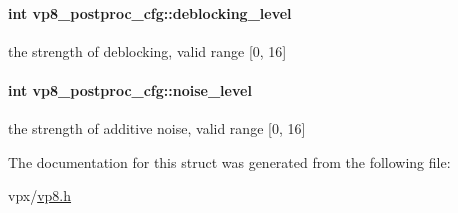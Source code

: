 \paragraph[{\texorpdfstring{deblocking\+\_\+level}{deblocking_level}}]{\setlength{\rightskip}{0pt plus 5cm}int vp8\+\_\+postproc\+\_\+cfg\+::deblocking\+\_\+level}\hypertarget{structvp8__postproc__cfg_afe919a9546e79798d840b1492f7e0249}{}\label{structvp8__postproc__cfg_afe919a9546e79798d840b1492f7e0249}
the strength of deblocking, valid range \mbox{[}0, 16\mbox{]} 
\paragraph[{\texorpdfstring{noise\+\_\+level}{noise_level}}]{\setlength{\rightskip}{0pt plus 5cm}int vp8\+\_\+postproc\+\_\+cfg\+::noise\+\_\+level}\hypertarget{structvp8__postproc__cfg_a32f28e4003e5d9bf55d188247f3f156c}{}\label{structvp8__postproc__cfg_a32f28e4003e5d9bf55d188247f3f156c}
the strength of additive noise, valid range \mbox{[}0, 16\mbox{]} 

The documentation for this struct was generated from the following file\+:\begin{DoxyCompactItemize}
\item 
vpx/\hyperlink{vp8_8h}{vp8.\+h}\end{DoxyCompactItemize}
